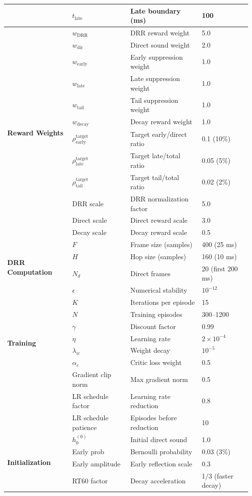 \begin{table}[htbp]
\begin{tabular}{@{}llp{6cm}l@{}}
& $t_{\text{late}}$ & Late boundary (ms) & 100 \\
\midrule
\multirow{12}{*}{\textbf{Reward Weights}} 
& $w_{\text{DRR}}$ & DRR reward weight & 5.0 \\
& $w_{\text{dir}}$ & Direct sound weight & 2.0 \\
& $w_{\text{early}}$ & Early suppression weight & 1.0 \\
& $w_{\text{late}}$ & Late suppression weight & 1.0 \\
& $w_{\text{tail}}$ & Tail suppression weight & 1.0 \\
& $w_{\text{decay}}$ & Decay reward weight & 1.0 \\
\cmidrule(lr){2-4}
& $\rho_{\text{early}}^{\text{target}}$ & Target early/direct ratio & 0.1 (10\%) \\
& $\rho_{\text{late}}^{\text{target}}$ & Target late/total ratio & 0.05 (5\%) \\
& $\rho_{\text{tail}}^{\text{target}}$ & Target tail/total ratio & 0.02 (2\%) \\
& DRR scale & DRR normalization factor & 5.0 \\
& Direct scale & Direct reward scale & 3.0 \\
& Decay scale & Decay reward scale & 0.5 \\
\midrule
\multirow{4}{*}{\textbf{DRR Computation}} 
& $F$ & Frame size (samples) & 400 (25 ms) \\
& $H$ & Hop size (samples) & 160 (10 ms) \\
& $N_d$ & Direct frames & 20 (first 200 ms) \\
& $\epsilon$ & Numerical stability & $10^{-12}$ \\
\midrule
\multirow{7}{*}{\textbf{Training}} 
& $K$ & Iterations per episode & 15 \\
& $N$ & Training episodes & 300--1200 \\
& $\gamma$ & Discount factor & 0.99 \\
& $\eta$ & Learning rate & $2 \times 10^{-4}$ \\
& $\lambda_w$ & Weight decay & $10^{-5}$ \\
& $\alpha_c$ & Critic loss weight & 0.5 \\
& Gradient clip norm & Max gradient norm & 0.5 \\
& LR schedule factor & Learning rate reduction & 0.8 \\
& LR schedule patience & Episodes before reduction & 10 \\
\midrule
\multirow{4}{*}{\textbf{Initialization}} 
& $h_0^{(0)}$ & Initial direct sound & 1.0 \\
& Early prob & Bernoulli probability & 0.03 (3\%) \\
& Early amplitude & Early reflection scale & 0.3 \\
& RT60 factor & Decay acceleration & 1/3 (faster decay) \\
\bottomrule
\end{tabular}
\end{table}

